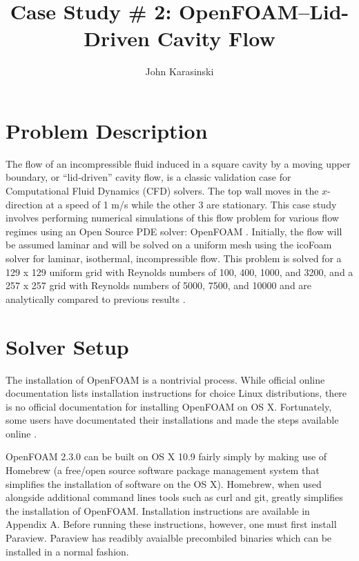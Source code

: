 \documentclass[twocolumn,10pt]{asme2ej}
\title{Case Study \# 2: OpenFOAM–Lid-Driven Cavity Flow}
\author{John Karasinski
    \affiliation{
  Graduate Student Researcher\\
  Center for Human/Robotics/Vehicle Integration and Performance\\
  Department of Mechanical and Aerospace Engineering\\
  University of California\\
  Davis, California 95616\\
    Email: karasinski@ucdavis.edu
    }
}
\begin{document}
\maketitle

\section{Problem Description}
The flow of an incompressible fluid induced in a square cavity by a moving upper boundary, or ``lid-driven'' cavity flow, is a classic validation case for Computational Fluid Dynamics (CFD) solvers. The top wall moves in the $x$-direction at a speed of 1 m/s while the other 3 are stationary. This case study involves performing numerical simulations of this flow problem for various flow regimes using an Open Source PDE solver: OpenFOAM \cite{jasak2007openfoam}. Initially, the flow will be assumed laminar and will be solved on a uniform mesh using the icoFoam solver for laminar, isothermal, incompressible flow. This problem is solved for a 129 x 129 uniform grid with Reynolds numbers of 100, 400, 1000, and 3200, and a 257 x 257 grid with Reynolds numbers of 5000, 7500, and 10000 and are analytically compared to previous results \cite{ghia1982high}.

\section{Solver Setup}
The installation of OpenFOAM is a nontrivial process. While official online documentation lists installation instructions for choice Linux distributions, there is no official documentation for installing OpenFOAM on OS X. Fortunately, some users have documentated their installations and made the steps available online \cite{ctfm_1}.

OpenFOAM 2.3.0 can be built on OS X 10.9 fairly simply by making use of Homebrew (a free/open source software package management system that simplifies the installation of software on the OS X). Homebrew, when used alongside additional command lines tools such as curl and git, greatly simplifies the installation of OpenFOAM. Installation instructions are available in Appendix A. Before running these instructions, however, one must first install Paraview. Paraview has readibly avaialble precombiled binaries which can be installed in a normal fashion.
\end{document}
